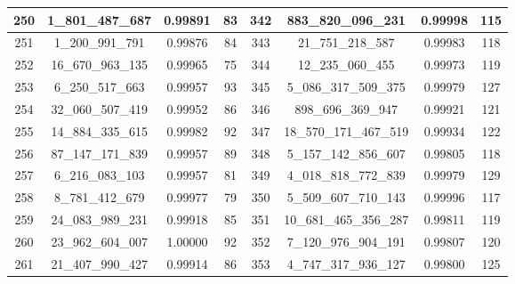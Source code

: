 \documentclass[letterpaper]{article}
\begin{document}
{\begin{tabular}{|c c c c| c c c c|}
        \hline
        250             & 1\_801\_487\_687   & 0.99891          & 83              & 342          & 883\_820\_096\_231     & 0.99998          & 115             \\
        \hline
        251             & 1\_200\_991\_791   & 0.99876          & 84              & 343          & 21\_751\_218\_587      & 0.99983          & 118             \\
        \hline
        252             & 16\_670\_963\_135  & 0.99965          & 75              & 344          & 12\_235\_060\_455      & 0.99973          & 119             \\
        \hline
        253             & 6\_250\_517\_663   & 0.99957          & 93              & 345          & 5\_086\_317\_509\_375  & 0.99979          & 127             \\
        \hline
        254             & 32\_060\_507\_419  & 0.99952          & 86              & 346          & 898\_696\_369\_947     & 0.99921          & 121             \\
        \hline
        255             & 14\_884\_335\_615  & 0.99982          & 92              & 347          & 18\_570\_171\_467\_519 & 0.99934          & 122             \\
        \hline
        256             & 87\_147\_171\_839  & 0.99957          & 89              & 348          & 5\_157\_142\_856\_607  & 0.99805          & 118             \\
        \hline
        257             & 6\_216\_083\_103   & 0.99957          & 81              & 349          & 4\_018\_818\_772\_839  & 0.99979          & 129             \\
        \hline
        258             & 8\_781\_412\_679   & 0.99977          & 79              & 350          & 5\_509\_607\_710\_143  & 0.99996          & 117             \\
        \hline
        259             & 24\_083\_989\_231  & 0.99918          & 85              & 351          & 10\_681\_465\_356\_287 & 0.99811          & 119             \\
        \hline
        260             & 23\_962\_604\_007  & 1.00000          & 92              & 352          & 7\_120\_976\_904\_191  & 0.99807          & 120             \\
        \hline
        261             & 21\_407\_990\_427  & 0.99914          & 86              & 353          & 4\_747\_317\_936\_127  & 0.99800          & 125             \\

\end{tabular}}
\end{document}
